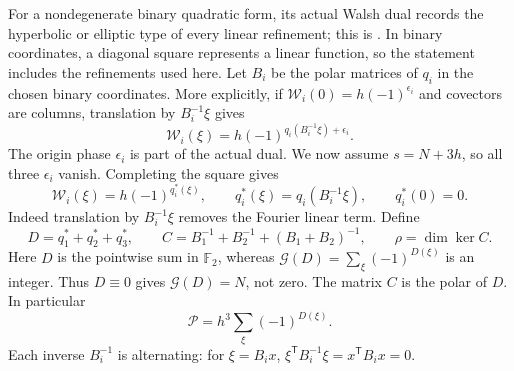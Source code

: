 \documentclass[11pt,a4paper]{article}
\theoremstyle{definition}
\theoremstyle{remark}
\numberwithin{equation}{section}
\newcommand{\F}{\mathbb F}
\newcommand{\Gauss}{\mathcal G}
\newcommand{\Walsh}{\mathcal W}
\newcommand{\Pm}{\mathcal P}
\begin{document}
For a nondegenerate binary quadratic form, its actual Walsh dual records
the hyperbolic or elliptic type of every linear refinement; this is
\citep[Theorem 2.1, pp.~509--510]{AFH24}. In binary coordinates, a
diagonal square represents a linear function, so the statement includes
the refinements used here. Let \(B_i\) be the polar matrices of \(q_i\)
in the chosen binary coordinates. More explicitly, if
\(\Walsh_i(0)=h(-1)^{\epsilon_i}\) and covectors are columns, translation
by \(B_i^{-1}\xi\) gives
\[
 \Walsh_i(\xi)=h(-1)^{q_i(B_i^{-1}\xi)+\epsilon_i}.
\]
The origin phase \(\epsilon_i\) is part of the actual dual. We now assume
\(s=N+3h\), so all three \(\epsilon_i\) vanish. Completing the square gives
\begin{equation}\label{eq:duals}
 \Walsh_i(\xi)=h(-1)^{q_i^*(\xi)},\qquad
 q_i^*(\xi)=q_i(B_i^{-1}\xi),\qquad q_i^*(0)=0.
\end{equation}
Indeed translation by \(B_i^{-1}\xi\) removes the Fourier linear
term. Define
\begin{equation}\label{eq:DC}
 D=q_1^*+q_2^*+q_3^*,\qquad
 C=B_1^{-1}+B_2^{-1}+(B_1+B_2)^{-1},\qquad
 \rho=\dim\ker C.
\end{equation}
Here \(D\) is the pointwise sum in \(\F_2\), whereas
\(\Gauss(D)=\sum_\xi(-1)^{D(\xi)}\) is an integer.
Thus \(D\equiv0\) gives \(\Gauss(D)=N\), not zero.
The matrix \(C\) is the polar of \(D\). In particular
\begin{equation}\label{eq:P-dual}
 \Pm=h^3\sum_{\xi}(-1)^{D(\xi)}.
\end{equation}
Each inverse \(B_i^{-1}\) is alternating: for \(\xi=B_i x\),
\(\xi^{\mathsf T}B_i^{-1}\xi=x^{\mathsf T}B_ix=0\).
\end{document}
